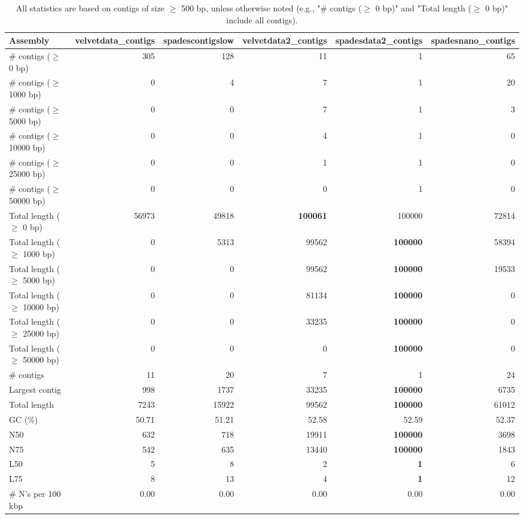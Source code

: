\documentclass[12pt,a4paper]{article}
\begin{document}
\begin{table}[ht]
\begin{center}
\caption{All statistics are based on contigs of size $\geq$ 500 bp, unless otherwise noted (e.g., "\# contigs ($\geq$ 0 bp)" and "Total length ($\geq$ 0 bp)" include all contigs).}
\begin{tabular}{|l*{5}{|r}|}
\hline
Assembly & velvetdata\_contigs & spadescontigslow & velvetdata2\_contigs & spadesdata2\_contigs & spadesnano\_contigs \\ \hline
\# contigs ($\geq$ 0 bp) & 305 & 128 & 11 & 1 & 65 \\ \hline
\# contigs ($\geq$ 1000 bp) & 0 & 4 & 7 & 1 & 20 \\ \hline
\# contigs ($\geq$ 5000 bp) & 0 & 0 & 7 & 1 & 3 \\ \hline
\# contigs ($\geq$ 10000 bp) & 0 & 0 & 4 & 1 & 0 \\ \hline
\# contigs ($\geq$ 25000 bp) & 0 & 0 & 1 & 1 & 0 \\ \hline
\# contigs ($\geq$ 50000 bp) & 0 & 0 & 0 & 1 & 0 \\ \hline
Total length ($\geq$ 0 bp) & 56973 & 49818 & {\bf 100061} & 100000 & 72814 \\ \hline
Total length ($\geq$ 1000 bp) & 0 & 5313 & 99562 & {\bf 100000} & 58394 \\ \hline
Total length ($\geq$ 5000 bp) & 0 & 0 & 99562 & {\bf 100000} & 19533 \\ \hline
Total length ($\geq$ 10000 bp) & 0 & 0 & 81134 & {\bf 100000} & 0 \\ \hline
Total length ($\geq$ 25000 bp) & 0 & 0 & 33235 & {\bf 100000} & 0 \\ \hline
Total length ($\geq$ 50000 bp) & 0 & 0 & 0 & {\bf 100000} & 0 \\ \hline
\# contigs & 11 & 20 & 7 & 1 & 24 \\ \hline
Largest contig & 998 & 1737 & 33235 & {\bf 100000} & 6735 \\ \hline
Total length & 7243 & 15922 & 99562 & {\bf 100000} & 61012 \\ \hline
GC (\%) & 50.71 & 51.21 & 52.58 & 52.59 & 52.37 \\ \hline
N50 & 632 & 718 & 19911 & {\bf 100000} & 3698 \\ \hline
N75 & 542 & 635 & 13440 & {\bf 100000} & 1843 \\ \hline
L50 & 5 & 8 & 2 & {\bf 1} & 6 \\ \hline
L75 & 8 & 13 & 4 & {\bf 1} & 12 \\ \hline
\# N's per 100 kbp & 0.00 & 0.00 & 0.00 & 0.00 & 0.00 \\ \hline
\end{tabular}
\end{center}
\end{table}
\end{document}
